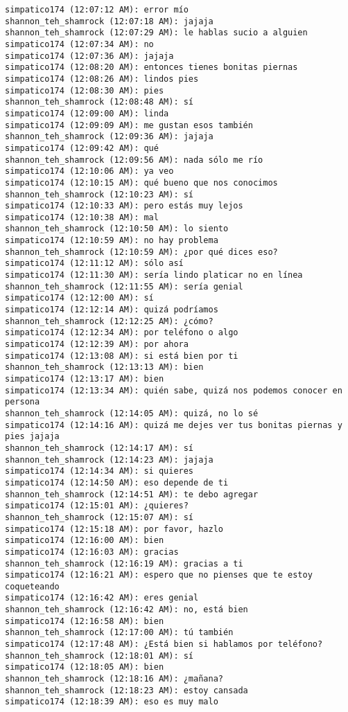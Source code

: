 \begin{verbatim}
simpatico174 (12:07:12 AM): error mío
shannon_teh_shamrock (12:07:18 AM): jajaja
shannon_teh_shamrock (12:07:29 AM): le hablas sucio a alguien
simpatico174 (12:07:34 AM): no
simpatico174 (12:07:36 AM): jajaja
simpatico174 (12:08:20 AM): entonces tienes bonitas piernas
simpatico174 (12:08:26 AM): lindos pies
simpatico174 (12:08:30 AM): pies
shannon_teh_shamrock (12:08:48 AM): sí
simpatico174 (12:09:00 AM): linda
simpatico174 (12:09:09 AM): me gustan esos también
shannon_teh_shamrock (12:09:36 AM): jajaja
simpatico174 (12:09:42 AM): qué
shannon_teh_shamrock (12:09:56 AM): nada sólo me río
simpatico174 (12:10:06 AM): ya veo
simpatico174 (12:10:15 AM): qué bueno que nos conocimos
shannon_teh_shamrock (12:10:23 AM): sí
simpatico174 (12:10:33 AM): pero estás muy lejos
simpatico174 (12:10:38 AM): mal
shannon_teh_shamrock (12:10:50 AM): lo siento
simpatico174 (12:10:59 AM): no hay problema
shannon_teh_shamrock (12:10:59 AM): ¿por qué dices eso?
simpatico174 (12:11:12 AM): sólo así
simpatico174 (12:11:30 AM): sería lindo platicar no en línea
shannon_teh_shamrock (12:11:55 AM): sería genial
simpatico174 (12:12:00 AM): sí
simpatico174 (12:12:14 AM): quizá podríamos
shannon_teh_shamrock (12:12:25 AM): ¿cómo?
simpatico174 (12:12:34 AM): por teléfono o algo
simpatico174 (12:12:39 AM): por ahora
simpatico174 (12:13:08 AM): si está bien por ti
shannon_teh_shamrock (12:13:13 AM): bien
simpatico174 (12:13:17 AM): bien
simpatico174 (12:13:34 AM): quién sabe, quizá nos podemos conocer en persona
shannon_teh_shamrock (12:14:05 AM): quizá, no lo sé
simpatico174 (12:14:16 AM): quizá me dejes ver tus bonitas piernas y pies jajaja
shannon_teh_shamrock (12:14:17 AM): sí
shannon_teh_shamrock (12:14:23 AM): jajaja
simpatico174 (12:14:34 AM): si quieres
simpatico174 (12:14:50 AM): eso depende de ti
shannon_teh_shamrock (12:14:51 AM): te debo agregar
simpatico174 (12:15:01 AM): ¿quieres?
shannon_teh_shamrock (12:15:07 AM): sí
simpatico174 (12:15:18 AM): por favor, hazlo
simpatico174 (12:16:00 AM): bien
simpatico174 (12:16:03 AM): gracias
shannon_teh_shamrock (12:16:19 AM): gracias a ti
simpatico174 (12:16:21 AM): espero que no pienses que te estoy coqueteando
simpatico174 (12:16:42 AM): eres genial
shannon_teh_shamrock (12:16:42 AM): no, está bien
simpatico174 (12:16:58 AM): bien
shannon_teh_shamrock (12:17:00 AM): tú también
simpatico174 (12:17:48 AM): ¿Está bien si hablamos por teléfono?
shannon_teh_shamrock (12:18:01 AM): sí
simpatico174 (12:18:05 AM): bien
shannon_teh_shamrock (12:18:16 AM): ¿mañana?
shannon_teh_shamrock (12:18:23 AM): estoy cansada
simpatico174 (12:18:39 AM): eso es muy malo

\end{verbatim}
